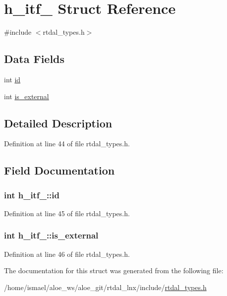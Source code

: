 \hypertarget{structh__itf__}{\section{h\-\_\-itf\-\_\- Struct Reference}
\label{structh__itf__}
}


{\ttfamily \#include $<$rtdal\-\_\-types.\-h$>$}

\subsection*{Data Fields}
\begin{DoxyCompactItemize}
\item 
int \hyperlink{structh__itf___abef006ee2e660568174317099553d1d2}{id}
\item 
int \hyperlink{structh__itf___a5f14435220765d8722f0cd55cadb7d5a}{is\-\_\-external}
\end{DoxyCompactItemize}


\subsection{Detailed Description}


Definition at line 44 of file rtdal\-\_\-types.\-h.



\subsection{Field Documentation}
\hypertarget{structh__itf___abef006ee2e660568174317099553d1d2}{
\subsubsection[{id}]{\setlength{\rightskip}{0pt plus 5cm}int h\-\_\-itf\-\_\-\-::id}}\label{structh__itf___abef006ee2e660568174317099553d1d2}


Definition at line 45 of file rtdal\-\_\-types.\-h.

\hypertarget{structh__itf___a5f14435220765d8722f0cd55cadb7d5a}{
\subsubsection[{is\-\_\-external}]{\setlength{\rightskip}{0pt plus 5cm}int h\-\_\-itf\-\_\-\-::is\-\_\-external}}\label{structh__itf___a5f14435220765d8722f0cd55cadb7d5a}


Definition at line 46 of file rtdal\-\_\-types.\-h.



The documentation for this struct was generated from the following file\-:\begin{DoxyCompactItemize}
\item 
/home/ismael/aloe\-\_\-ws/aloe\-\_\-git/rtdal\-\_\-lnx/include/\hyperlink{rtdal__types_8h}{rtdal\-\_\-types.\-h}\end{DoxyCompactItemize}
